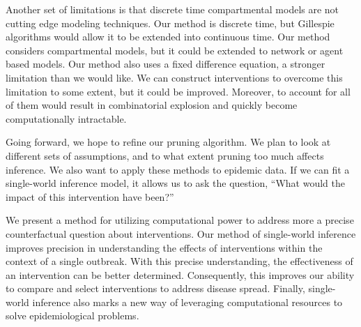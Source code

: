 \documentclass[openacc]{rsproca_new}%
\begin{document}
Another set of limitations is that discrete time compartmental models are not cutting edge modeling techniques.
Our method is discrete time, but Gillespie algorithms would allow it to be extended into continuous time.
Our method considers compartmental models, but it could be extended to network or agent based models.
Our method also uses a fixed difference equation, a stronger limitation than we would like.
We can construct interventions to overcome this limitation to some extent, but it could be improved.
Moreover, to account for all of them would result in  combinatorial explosion and quickly become computationally intractable. %

Going forward, we hope to refine our pruning algorithm.
We plan to look at different sets of assumptions, and to what extent pruning too much affects inference.
We also want to apply these methods to epidemic data.
If we can fit a single-world inference model, it allows us to ask the question, ``What would the impact of this intervention have been?''

We present a method for utilizing computational power to address more a precise counterfactual question about interventions.
Our method of single-world inference improves precision in understanding the effects of interventions within the context of a single outbreak.
With this precise understanding, the effectiveness of an intervention can be better determined.
Consequently, this improves our ability to compare and select interventions to address disease spread.
Finally, single-world inference also marks a new way of leveraging computational resources to solve epidemiological problems.


\enlargethispage{20pt}











\end{document}
